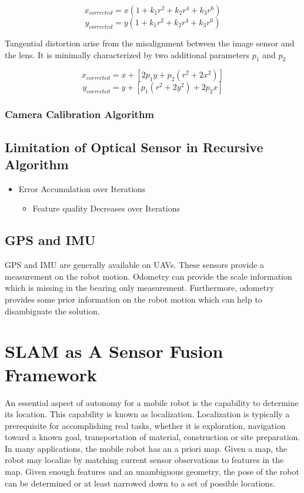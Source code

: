 $$ x_{corrected} = x(1+k_1r^2+k_2r^4+k_3r^6)$$
$$ y_{corrected} = y(1+k_1r^2+k_2r^4+k_3r^6)$$

\noindent Tangential distortion arise from the misalignment
between the image sensor and the lens. It is minimally characterized
by two additional parameters $p_1$ and $p_2$

$$x_{corrected} = x+[2p_1y+p_2(r^2+2x^2)]$$
$$y_{corrected} = y+[p_1(r^2+2y^2)+2p_2x]$$

\subsubsection{Camera Calibration Algorithm}

\subsection{Limitation of Optical Sensor in Recursive Algorithm}
\label{sec:OpticalSensorLimitation}

\begin{itemize}
  \item Error Accumulation over Iterations
  \begin{itemize}
    \item Feature quality Decreases over Iterations
  \end{itemize}
\end{itemize}

\subsection{GPS and IMU}\label{sec:gps_and_imu}
GPS and IMU are generally available on UAVs. These sensors provide a 
measurement on the robot motion. Odometry can provide the scale 
information which is missing in the bearing only measurement. 
Furthermore, odometry provides some prior information on the robot 
motion which can help to disambiguate the solution.

\section{SLAM as A Sensor Fusion Framework}
\label{sec:SLAM}
An essential aspect of autonomy for a mobile robot is the capability to 
determine its location. This capability is known as localization. 
Localization is typically a prerequisite for accomplishing real tasks, 
whether it is exploration, navigation toward a known goal, 
transportation of material, construction or site preparation. In many 
applications, the mobile robot has an a priori map. Given a map, the 
robot may localize by matching current sensor observations to features 
in the map. Given enough features and an unambiguous geometry, the pose 
of the robot can be determined or at least narrowed down to a set of 
possible locations.

